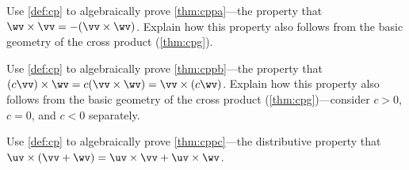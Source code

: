 \begin{exercise} \label{ex:cppa} 
Use \cref{def:cp} to algebraically prove \cref{thm:cppa}---the property that \(\wv\times\vv=-(\vv\times\wv)\).
Explain how this property also follows from the basic geometry of the cross product (\cref{thm:cpg}).
\end{exercise}



\begin{exercise} \label{ex:cppb} 
Use \cref{def:cp} to algebraically prove \cref{thm:cppb}---the property that \((c\vv)\times\wv=c(\vv\times\wv)=\vv\times(c\wv)\).
Explain how this property also follows from the basic geometry of the cross product (\cref{thm:cpg})---consider \(c>0\), \(c=0\), and \(c<0\) separately.
\end{exercise}



\begin{exercise} \label{ex:cppc} 
Use \cref{def:cp} to algebraically prove \cref{thm:cppc}---the distributive property that \(\uv\times(\vv+\wv)=\uv\times\vv+\uv\times\wv\).
\end{exercise}





